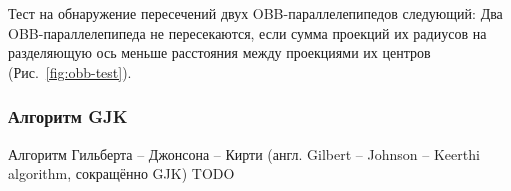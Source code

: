Тест на обнаружение пересечений двух OBB-параллелепипедов следующий: Два
OBB-параллелепипеда не пересекаются, если сумма проекций их радиусов на
разделяющую ось меньше расстояния между проекциями их центров
(Рис.~\ref{fig:obb-test}).

\subsubsection{Алгоритм GJK}

Алгоритм Гильберта -- Джонсона -- Кирти (англ. Gilbert -- Johnson -- Keerthi algorithm, сокращённо GJK) TODO

